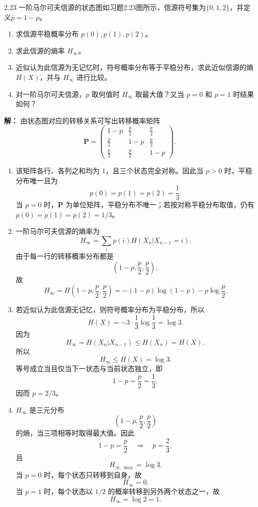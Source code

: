 \documentclass[UTF8,11pt,a4paper]{ctexart}
\begin{document}
\vspace{0.8em}

\begin{problem}{2.23}
一阶马尔可夫信源的状态图如习题2.23图所示，信源符号集为$\{0,1,2\}$，并定义$\bar{p}=1-p$。

\begin{enumerate}[label=\textnormal{(\alph*)}]
  \item 求信源平稳概率分布 $p(0), p(1), p(2)$。

  \item 求此信源的熵率 $H_\infty$。

  \item 近似认为此信源为无记忆时，符号概率分布等于平稳分布，求此近似信源的熵 $H(X)$，并与 $H_\infty$ 进行比较。

  \item 对一阶马尔可夫信源，$p$ 取何值时 $H_\infty$ 取最大值？又当 $p=0$ 和 $p=1$ 时结果如何？
\end{enumerate}
\end{problem}
\noindent\textbf{解：}
由状态图对应的转移关系可写出转移概率矩阵
\[
\boldsymbol{P}=
\begin{pmatrix}
1-p & \frac p2 & \frac p2\\
\frac p2 & 1-p & \frac p2\\
\frac p2 & \frac p2 & 1-p
\end{pmatrix}.
\]
\begin{enumerate}[label=\textnormal{(\alph*)}]
  \item 该矩阵各行、各列之和均为 $1$，且三个状态完全对称。因此当 $p>0$ 时，平稳分布唯一且为
  \[
  p(0)=p(1)=p(2)=\frac13.
  \]
  当 $p=0$ 时，$\boldsymbol{P}$ 为单位矩阵，平稳分布不唯一；若按对称平稳分布取值，仍有 $p(0)=p(1)=p(2)=1/3$。

  \item 一阶马尔可夫信源的熵率为
  \[
  H_\infty=\sum_i p(i)H(X_n|X_{n-1}=i).
  \]
  由于每一行的转移概率分布都是
  \[
  \left(1-p,\frac p2,\frac p2\right),
  \]
  故
  \[
  H_\infty
  =H\!\left(1-p,\frac p2,\frac p2\right)
  =-(1-p)\log(1-p)-p\log\frac p2.
  \]

  \item 若近似认为此信源无记忆，则符号概率分布为平稳分布，所以
  \[
  H(X)=-3\cdot\frac13\log\frac13=\log 3.
  \]
  因为
  \[
  H_\infty=H(X_n|X_{n-1})\le H(X_n)=H(X),
  \]
  所以
  \[
  H_\infty\le H(X)=\log 3.
  \]
  等号成立当且仅当下一状态与当前状态独立，即
  \[
  1-p=\frac p2=\frac13,
  \]
  因而 $p=2/3$。

  \item $H_\infty$ 是三元分布
  \[
  \left(1-p,\frac p2,\frac p2\right)
  \]
  的熵，当三项相等时取得最大值。因此
  \[
  1-p=\frac p2 \quad\Longrightarrow\quad p=\frac23,
  \]
  且
  \[
  H_{\infty,\max}=\log 3.
  \]
  当 $p=0$ 时，每个状态只转移到自身，故
  \[
  H_\infty=0.
  \]
  当 $p=1$ 时，每个状态以 $1/2$ 的概率转移到另外两个状态之一，故
  \[
  H_\infty=\log 2=1.
  \]
\end{enumerate}
\end{document}
